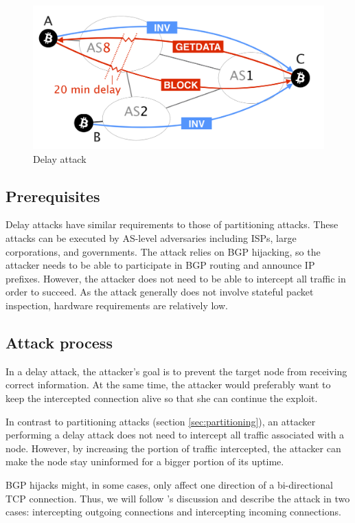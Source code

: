 \documentclass[12pt]{article}
\begin{document}
\begin{figure}
\centering
\includegraphics[width=0.6\columnwidth]{images/delay-attack.png}
\caption{Delay attack \cite{RoutingAttacks}}
\label{fig:delay}
\end{figure}

\subsection{Prerequisites}

Delay attacks have similar requirements to those of partitioning attacks. These attacks can be executed by AS-level adversaries including ISPs, large corporations, and governments. The attack relies on BGP hijacking, so the attacker needs to be able to participate in BGP routing and announce IP prefixes. However, the attacker does not need to be able to intercept all traffic in order to succeed. As the attack generally does not involve stateful packet inspection, hardware requirements are relatively low.

\subsection{Attack process}

In a delay attack, the attacker's goal is to prevent the target node from receiving correct information. At the same time, the attacker would preferably want to keep the intercepted connection alive so that she can continue the exploit.

In contrast to partitioning attacks (section \ref{sec:partitioning}), an attacker performing a delay attack does not need to intercept all traffic associated with a node. However, by increasing the portion of traffic intercepted, the attacker can make the node stay uninformed for a bigger portion of its uptime.

BGP hijacks might, in some cases, only affect one direction of a bi-directional TCP connection. Thus, we will follow \cite{RoutingAttacks}'s discussion and describe the attack in two cases: intercepting outgoing connections and intercepting incoming connections.
\end{document}
